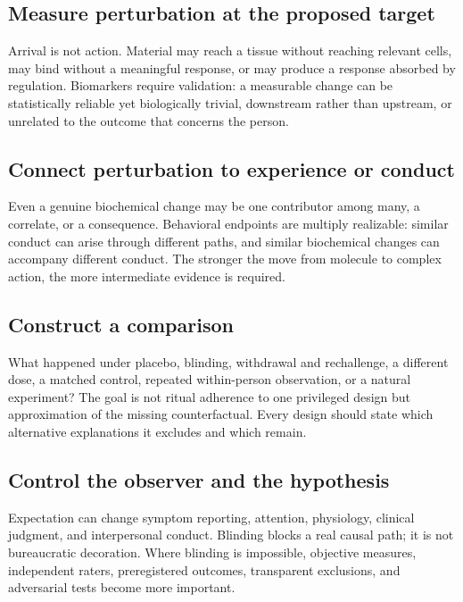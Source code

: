 \documentclass[11pt]{article}
\begin{document}
\subsection{Measure perturbation at the proposed target}

Arrival is not action. Material may reach a tissue without reaching relevant cells, may bind without a meaningful response, or may produce a response absorbed by regulation. Biomarkers require validation: a measurable change can be statistically reliable yet biologically trivial, downstream rather than upstream, or unrelated to the outcome that concerns the person.

\subsection{Connect perturbation to experience or conduct}

Even a genuine biochemical change may be one contributor among many, a correlate, or a consequence. Behavioral endpoints are multiply realizable: similar conduct can arise through different paths, and similar biochemical changes can accompany different conduct. The stronger the move from molecule to complex action, the more intermediate evidence is required.

\subsection{Construct a comparison}

What happened under placebo, blinding, withdrawal and rechallenge, a different dose, a matched control, repeated within-person observation, or a natural experiment? The goal is not ritual adherence to one privileged design but approximation of the missing counterfactual. Every design should state which alternative explanations it excludes and which remain.

\subsection{Control the observer and the hypothesis}

Expectation can change symptom reporting, attention, physiology, clinical judgment, and interpersonal conduct. Blinding blocks a real causal path; it is not bureaucratic decoration. Where blinding is impossible, objective measures, independent raters, preregistered outcomes, transparent exclusions, and adversarial tests become more important.
\end{document}
